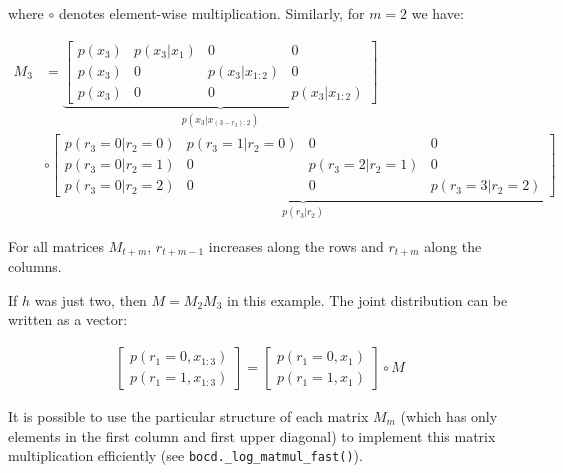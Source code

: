 \documentclass{article}
\begin{document}
where $\circ$ denotes element-wise multiplication. Similarly, for $m=2$ we have:

\begin{align}M_{3} & =\underbrace{\left[\begin{array}{cccc}
p(x_{3}) & p(x_{3}\vert x_{1}) & 0 & 0\\
p(x_{3}) & 0 & p(x_{3}\vert x_{1:2}) & 0\\
p(x_{3}) & 0 & 0 & p(x_{3}\vert x_{1:2})
\end{array}\right]}_{p(x_{3}\vert x_{(3-r_{3}):2})}\\
 & \circ\underbrace{\left[\begin{array}{cccc}
p(r_{3}=0\vert r_{2}=0) & p(r_{3}=1\vert r_{2}=0) & 0 & 0\\
p(r_{3}=0\vert r_{2}=1) & 0 & p(r_{3}=2\vert r_{2}=1) & 0\\
p(r_{3}=0\vert r_{2}=2) & 0 & 0 & p(r_{3}=3\vert r_{2}=2)
\end{array}\right]}_{p(r_{3}\vert r_{2})}
\end{align}

For all matrices $M_{t+m}$, $r_{t+m-1}$ increases along the rows and $r_{t+m}$ along the columns.

If $h$ was just two, then $M=M_{2}M_{3}$ in this example. The joint distribution can be written as a vector:

\begin{align}
\left[\begin{array}{c}
p(r_{1}=0,x_{1:3})\\
p(r_{1}=1,x_{1:3})
\end{array}\right]=\left[\begin{array}{c}
p(r_{1}=0,x_{1})\\
p(r_{1}=1,x_{1})
\end{array}\right]\circ M
\end{align}

It is possible to use the particular structure of each matrix $M_{m}$ (which has only elements in the first column and first upper diagonal) to implement this matrix multiplication efficiently (see \texttt{bocd.\_log\_matmul\_fast()}).
\end{document}
